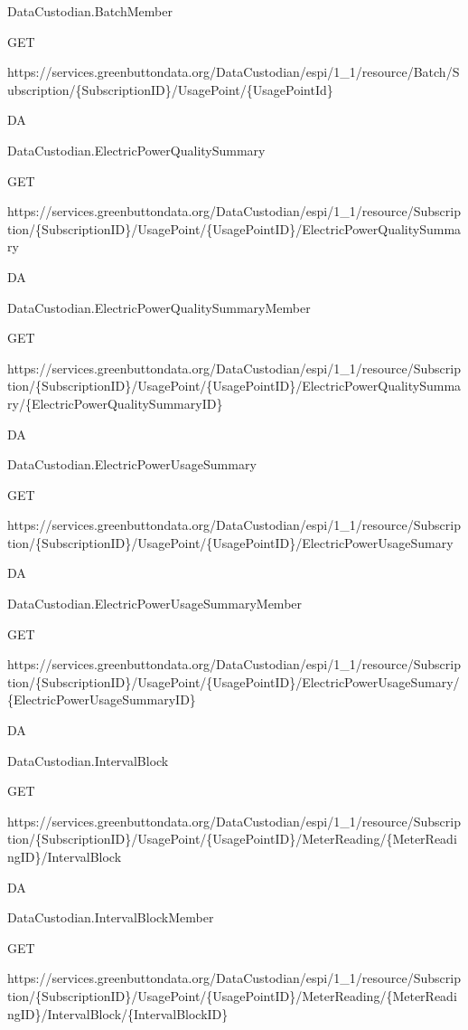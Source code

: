 \documentclass[a4paper,12pt,single,pdftex]{scrbook}
\begin{document}
DataCustodian.BatchMember

GET

https://services.greenbuttondata.org/DataCustodian/espi/1\_1/resource/Batch/Subscription/\{SubscriptionID\}/UsagePoint/\{UsagePointId\}

DA

DataCustodian.ElectricPowerQualitySummary

GET

https://services.greenbuttondata.org/DataCustodian/espi/1\_1/resource/Subscription/\{SubscriptionID\}/UsagePoint/\{UsagePointID\}/ElectricPowerQualitySummary

DA

DataCustodian.ElectricPowerQualitySummaryMember

GET

https://services.greenbuttondata.org/DataCustodian/espi/1\_1/resource/Subscription/\{SubscriptionID\}/UsagePoint/\{UsagePointID\}/ElectricPowerQualitySummary/\{ElectricPowerQualitySummaryID\}

DA

DataCustodian.ElectricPowerUsageSummary

GET

https://services.greenbuttondata.org/DataCustodian/espi/1\_1/resource/Subscription/\{SubscriptionID\}/UsagePoint/\{UsagePointID\}/ElectricPowerUsageSumary

DA

DataCustodian.ElectricPowerUsageSummaryMember

GET

https://services.greenbuttondata.org/DataCustodian/espi/1\_1/resource/Subscription/\{SubscriptionID\}/UsagePoint/\{UsagePointID\}/ElectricPowerUsageSumary/\{ElectricPowerUsageSummaryID\}

DA

DataCustodian.IntervalBlock

GET

https://services.greenbuttondata.org/DataCustodian/espi/1\_1/resource/Subscription/\{SubscriptionID\}/UsagePoint/\{UsagePointID\}/MeterReading/\{MeterReadingID\}/IntervalBlock

DA

DataCustodian.IntervalBlockMember

GET

https://services.greenbuttondata.org/DataCustodian/espi/1\_1/resource/Subscription/\{SubscriptionID\}/UsagePoint/\{UsagePointID\}/MeterReading/\{MeterReadingID\}/IntervalBlock/\{IntervalBlockID\}
\end{document}

